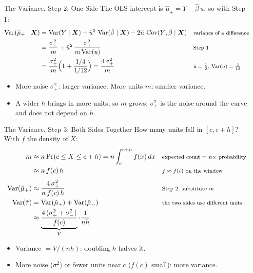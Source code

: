 \documentclass[aspectratio=169,11pt,xcolor=dvipsnames]{beamer}
\DeclareMathOperator{\Cov}{Cov}
\DeclareMathOperator{\Var}{Var}
\begin{document}
\begin{frame}{The Variance, Step 2: One Side}
The OLS intercept is $\hat\mu_+ = \bar Y - \hat\beta\,\bar u$, so with Step 1:
\begin{align*}
  \Var(\hat\mu_+\mid\bm X) &= \Var(\bar Y\mid\bm X) + \bar u^2\,\Var(\hat\beta\mid\bm X)
     - 2\bar u\,\Cov(\bar Y, \hat\beta\mid\bm X)
   && \text{\footnotesize variance of a difference} \\
  &= \frac{\sigma_+^2}{m} + \bar u^2\,\frac{\sigma_+^2}{m\Var(u)}
   && \text{\footnotesize Step 1} \\
  &= \frac{\sigma_+^2}{m}\Big(1 + \frac{1/4}{1/12}\Big) = \frac{4\,\sigma_+^2}{m}
   && \text{\footnotesize $\bar u = \tfrac12$, $\Var(u) = \tfrac1{12}$}
\end{align*}
\vskip-2pt
\begin{itemize}\itemsep2pt
  \item \alert{More noise $\sigma_+^2$: larger variance. More units $m$: smaller variance.}
  \item A wider $h$ brings in more units, so $m$ grows; $\sigma_+^2$ is the noise
        around the curve and does not depend on $h$.
\end{itemize}
\end{frame}

\begin{frame}{The Variance, Step 3: Both Sides Together}
How many units fall in $[c, c+h]$? With $f$ the density of $X$:
\begin{align*}
  m &\approx n \Pr(c \leq X \leq c+h) = n\int_c^{c+h} f(x)\,dx
   && \text{\footnotesize expected count $=$ $n \times$ probability} \\
  &\approx n\,f(c)\,h
   && \text{\footnotesize $f \approx f(c)$ on the window} \\[4pt]
  \Var(\hat\mu_+) &\approx \frac{4\,\sigma_+^2}{n\,f(c)\,h}
   && \text{\footnotesize Step 2, substitute $m$} \\
  \Var(\hat\tau) &= \Var(\hat\mu_+) + \Var(\hat\mu_-)
   && \text{\footnotesize the two sides use different units} \\
  &\approx \underbrace{\frac{4\,(\sigma_+^2 + \sigma_-^2)}{f(c)}}_{V}\cdot\frac{1}{nh}
\end{align*}
\vskip-4pt
\begin{itemize}\itemsep2pt
  \item \alert{Variance $= V/(nh)$}: doubling $h$ halves it.
  \item More noise ($\sigma^2$) or fewer units near $c$ ($f(c)$ small): more variance.
\end{itemize}
\end{frame}
\end{document}
